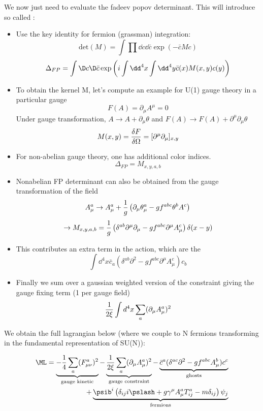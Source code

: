 \documentclass[11pt]{scrartcl}
\begin{document}
We now just need to evaluate the fadeev popov determinant.  This will introduce so called :
\begin{itemize}
	\item Use the key identity for fermion (grassman) integration:
	\[ \mathrm{det} (M) = \int \prod \dd c \dd \bar{c} \exp(-{\bar{c} M c}) \]
	\[ \Delta_{FP} = \int \D c \D \bar{c} \exp \left( i \int \dd^4 x \int \dd^4 y \bar{c} (x) M(x, y) c(y) \right) \]
	\item To obtain the kernel M, let's compute an example for U(1) gauge theory in a particular gauge
	\[F(A) = \partial_\mu A^\mu = 0 \]
	Under gauge transformation, $A \rightarrow A + \partial_\mu \theta$
	and $F(A) \rightarrow F(A) + \partial^\mu \partial_\mu \theta$
	\[M(x, y) = {\delta F \over \delta \Omega} = [\partial^\mu \partial_\mu]_{x, y} \]
	\item For non-abelian gauge theory, one has additional color indices.
	\[\Delta_{FP} = M_{x, y, a, b} \]
	\item Nonabelian FP determinant can also be obtained from the gauge transformation of the field
	\[A^{a}_\mu \rightarrow A^{a}_\mu + {1 \over g} \left( \partial_\mu \theta^{a}_\mu - g f^{abc}  \theta^{b} A^{c} \right)\] 
	\[ \rightarrow M_{x, y, a, b} = {1 \over g} \left(\delta^{ab} \partial^\mu \partial_\mu - g f^{abc}  \partial^\mu A^{c}_\mu \right) \delta(x-y) \]
	\item This contributes an extra term in the action, which are the 
	\[ \int \dd^4 x \bar{c}_a \left(\delta^{ab} \partial^2 - g f^{abc} \partial^\mu A^c_\mu \right) c_b \]
	\item Finally we sum over a gaussian weighted version of the constraint
	giving the gauge fixing term (1 per gauge field)
	\[ {1 \over 2 \xi} \int d^4 x \sum_a (\partial_\mu A^a_\mu)^2\]
\end{itemize}

We obtain the full lagrangian below (where we couple to N fermions transforming in the fundamental representation of SU(N)):

\begin{align*}
\ML = \underbrace{-\frac14 \sum_a (F^a_{\mu \nu})^2}_{\text{gauge kinetic}} - \underbrace{{1 \over 2 \xi} \sum_a (\partial_\mu A_\mu^a)^2}_{\text{gauge constraint}} - \underbrace{\bar{c}^a(\delta^{ac} \partial^2 - g f^{abc} A^{b}_\mu) c^c}_{\text{ghosts}} \\
+ \underbrace{\psib^{i} \left(\delta_{ij} i \pslash  + g \gamma^{\mu} A_{\mu}^a T^{a}_{ij} - m \delta_{ij} \right) \psi_j}_{\text{fermions}} 
\end{align*}
\end{document}
